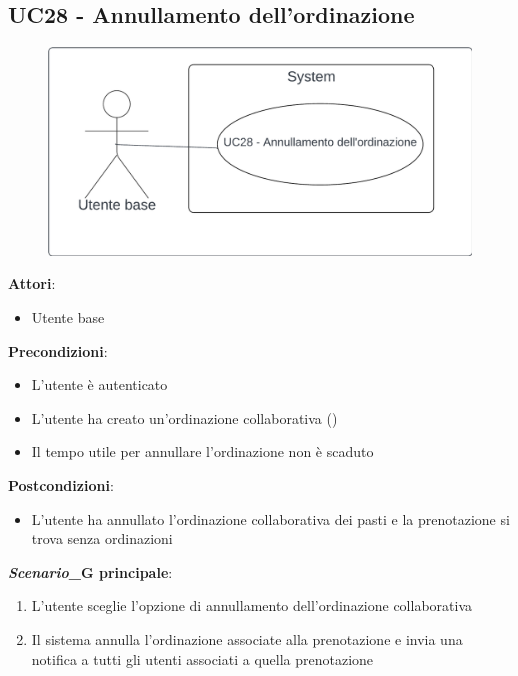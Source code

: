 \subsection{UC28 - Annullamento dell'ordinazione}\label{usecase:28}
\begin{figure}[H]
    \centering
    \includegraphics[width=0.9\linewidth]{ucd/UCD28.png}
\end{figure}
\textbf{Attori}:
\begin{itemize}
    \item Utente base
\end{itemize}
\textbf{Precondizioni}:
\begin{itemize}
    \item L'utente è autenticato
    \item L'utente ha creato un'ordinazione collaborativa ()
    \item Il tempo utile per annullare l'ordinazione non è scaduto
\end{itemize}
\textbf{Postcondizioni}:
\begin{itemize}
    \item L'utente ha annullato l'ordinazione collaborativa dei pasti e la prenotazione si trova senza ordinazioni
\end{itemize}
\textbf{\textit{Scenario}_G principale}:
\begin{enumerate}
    \item L'utente sceglie l'opzione di annullamento dell'ordinazione collaborativa
    \item Il sistema annulla l'ordinazione associate alla prenotazione e invia una notifica a tutti gli utenti associati a quella prenotazione
\end{enumerate}
\newpage